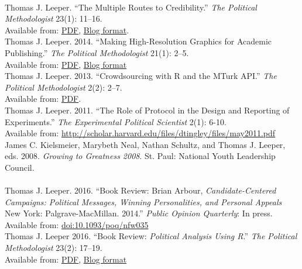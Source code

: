 \documentclass[12pt]{article}
\newcommand{\topic}[1]{\pagebreak[3]\indent {\color{lg}{\footnotesize #1 }}\\}
\newcommand{\entry}[1]{\indent {\color{lg}\guillemotright}\hspace{2pt}#1\vspace{.25em}\\}
\begin{document}
\topic{Other Academic Publications}
	\entry{Thomas J. Leeper. ``The Multiple Routes to Credibility.'' \textit{The Political Methodologist} 23(1): 11--16.\\ Available from: \href{https://thepoliticalmethodologist.files.wordpress.com/2016/02/tpm_v23_n1.pdf}{PDF}, \href{https://thepoliticalmethodologist.com/2015/12/21/the-multiple-routes-to-credibility/}{Blog format}.}
	\entry{Thomas J. Leeper. 2014. ``Making High-Resolution Graphics for Academic Publishing.'' \textit{The Political Methodologist} 21(1): 2--5.\\ Available from: \href{https://thepoliticalmethodologist.files.wordpress.com/2014/06/tpm_v21_n12.pdf}{PDF}, \href{https://thepoliticalmethodologist.com/2013/11/25/making-high-resolution-graphics-for-academic-publishing/}{Blog format}}
	\entry{Thomas J. Leeper. 2013. ``Crowdsourcing with R and the MTurk API.'' \textit{The Political Methodologist} 2(2): 2--7.\\ Available from: \href{https://thepoliticalmethodologist.files.wordpress.com/2013/09/tpm_v20_n21.pdf}{PDF}.}
	\entry{Thomas J. Leeper. 2011. ``The Role of Protocol in the Design and Reporting of Experiments.'' \textit{The Experimental Political Scientist} 2(1): 6-10.\\ Available from: \url{http://scholar.harvard.edu/files/dtingley/files/may2011.pdf}}
	\entry{James C. Kielsmeier, Marybeth Neal, Nathan Schultz, and Thomas J. Leeper, eds. 2008. \textit{Growing to Greatness 2008}. St. Paul: National Youth Leadership Council.}

\topic{Book Reviews}
	\entry{Thomas J. Leeper. 2016. ``Book Review: Brian Arbour, \textit{Candidate-Centered Campaigns: Political Messages, Winning Personalities, and Personal Appeals} New York: Palgrave-MacMillan. 2014.'' \textit{Public Opinion Quarterly}: In press. Available from: \href{http://doi.org/10.1093/poq/nfw035}{doi:10.1093/poq/nfw035}}
	\entry{Thomas J. Leeper 2016. ``Book Review: \textit{Political Analysis Using R}.'' \textit{The Political Methodologist} 23(2): 17--19.\\ Available from: \href{https://thepoliticalmethodologist.files.wordpress.com/2016/08/tpm_v23_n2.pdf}{PDF}, \href{https://thepoliticalmethodologist.com/2016/05/25/book-review-political-analysis-using-r/}{Blog format}}
\end{document}
